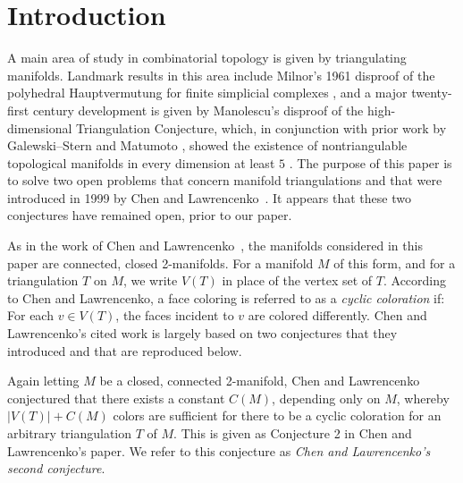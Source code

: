 \documentclass[12pt]{article}
\begin{document}

\vspace{0.1in}


\section{Introduction}
 A main area of study in combinatorial topology is given by triangulating manifolds. Landmark results in this area include Milnor's 1961 
 disproof of the polyhedral Hauptvermutung for finite simplicial complexes \cite{Milnor1961}, and a major twenty-first century 
 development is given by Manolescu's disproof of the high-dimensional Triangulation Conjecture, which, in conjunction with prior work 
 by Galewski--Stern \cite{GalewskiStern1980} and Matumoto \cite{Matumoto1978}, showed the existence of nontriangulable topological 
 manifolds in every dimension at least $5$ \cite{Manolescu2016}. The purpose of this paper is to solve two open problems that concern 
 manifold triangulations and that were introduced in 1999 by Chen and Lawrencenko~\cite{ChenLawrencenko1999}. It appears that these 
 two conjectures have remained open, prior to our paper. 

 As in the work of Chen and Lawrencenko~\cite{ChenLawrencenko1999}, the manifolds considered in this paper are connected, closed 
 2-manifolds. For a manifold $M$ of this form, and for a triangulation $T$ on $M$, we write $V(T)$ in place of the vertex set of $T$. 
 According to Chen and Lawrencenko, a face coloring is referred to as a \emph{cyclic coloration} if: For each $v \in V(T)$, the faces 
 incident to $v$ are colored differently. Chen and Lawrencenko's cited work is largely based on two conjectures that they introduced and 
 that are reproduced below. 

 Again letting $M$ be a closed, connected 2-manifold, Chen and Lawrencenko~\cite{ChenLawrencenko1999} conjectured that there 
 exists a constant $C(M)$, depending only on $M$, whereby $|V(T)| + C(M)$ colors are sufficient for there to be a cyclic coloration for an 
 arbitrary triangulation $T$ of $M$. This is given as Conjecture 2 in Chen and Lawrencenko's paper. We refer to this conjecture as 
 \emph{Chen and Lawrencenko's second conjecture}. 
 
\end{document}
